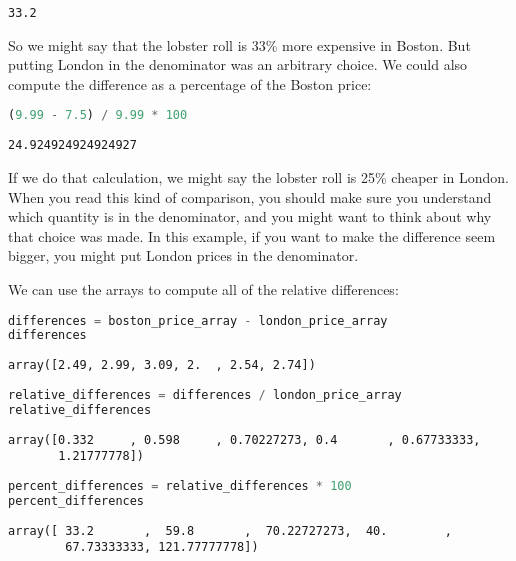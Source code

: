\begin{lstlisting}[style=output]
33.2
\end{lstlisting}

So we might say that the lobster roll is 33\% more expensive in Boston.
But putting London in the denominator was an arbitrary choice. We could
also compute the difference as a percentage of the Boston price:

\begin{lstlisting}[language=Python,style=source]
(9.99 - 7.5) / 9.99 * 100
\end{lstlisting}

\begin{lstlisting}[style=output]
24.924924924924927
\end{lstlisting}

If we do that calculation, we might say the lobster roll is 25\% cheaper
in London. When you read this kind of comparison, you should make sure
you understand which quantity is in the denominator, and you might want
to think about why that choice was made. In this example, if you want to
make the difference seem bigger, you might put London prices in the
denominator.

We can use the arrays to compute all of the relative differences:

\begin{lstlisting}[language=Python,style=source]
differences = boston_price_array - london_price_array
differences
\end{lstlisting}

\begin{lstlisting}[style=output]
array([2.49, 2.99, 3.09, 2.  , 2.54, 2.74])
\end{lstlisting}

\begin{lstlisting}[language=Python,style=source]
relative_differences = differences / london_price_array
relative_differences
\end{lstlisting}

\begin{lstlisting}[style=output]
array([0.332     , 0.598     , 0.70227273, 0.4       , 0.67733333,
       1.21777778])
\end{lstlisting}

\begin{lstlisting}[language=Python,style=source]
percent_differences = relative_differences * 100
percent_differences
\end{lstlisting}

\begin{lstlisting}[style=output]
array([ 33.2       ,  59.8       ,  70.22727273,  40.        ,
        67.73333333, 121.77777778])
\end{lstlisting}

